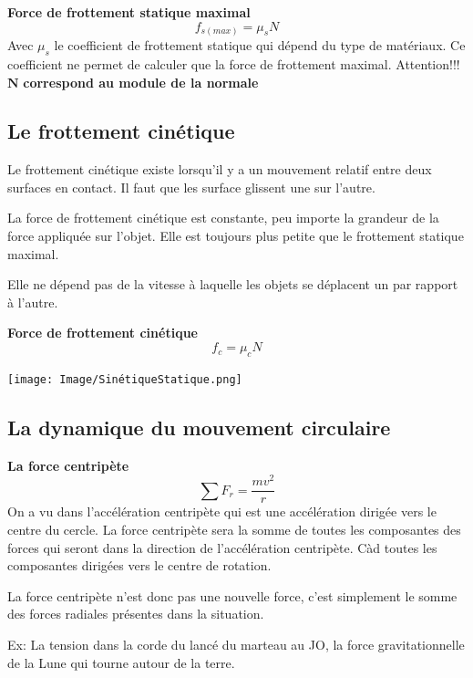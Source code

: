 \documentclass{article}
\begin{document}
\noindent
\textbf{Force de frottement statique maximal}
\[f_{s(max)} = \mu_sN\]
Avec $\mu_s$ le coefficient de frottement statique qui dépend du type de matériaux. Ce coefficient ne permet de calculer que la force de frottement maximal.
\newline
Attention!!! $\mathbf{N}$ \textbf{correspond au module de la normale}

\subsection{Le frottement cinétique}
Le frottement cinétique existe lorsqu'il y a un mouvement relatif entre deux surfaces en contact. Il faut que les surface glissent une sur l'autre.
\newline

La force de frottement cinétique est constante, peu importe la grandeur de la force appliquée sur l'objet. Elle est toujours plus petite que le frottement statique maximal.
\newline

Elle ne dépend pas de la vitesse à laquelle les objets se déplacent un par rapport à l'autre.
\newline

\noindent
\textbf{Force de frottement cinétique}
\[f_c = \mu_cN\]
\newline

 \texttt{[image: Image/SinétiqueStatique.png]}

\subsection{La dynamique du mouvement circulaire}

\textbf{La force centripète}
\[\sum F_r = \frac{mv^2}{r}\]
On a vu dans l'accélération centripète qui est une accélération dirigée vers le centre du cercle.
\newline
La force centripète sera la somme de toutes les composantes des forces qui seront dans la direction de l'accélération centripète. Càd toutes les composantes dirigées vers le centre de rotation.
\newline

La force centripète n'est donc pas une nouvelle force, c'est simplement le somme des forces radiales présentes dans la situation.
\newline

Ex: La tension dans la corde du lancé du marteau au JO, la force gravitationnelle de la Lune qui tourne autour de la terre.
\newline
\end{document}
